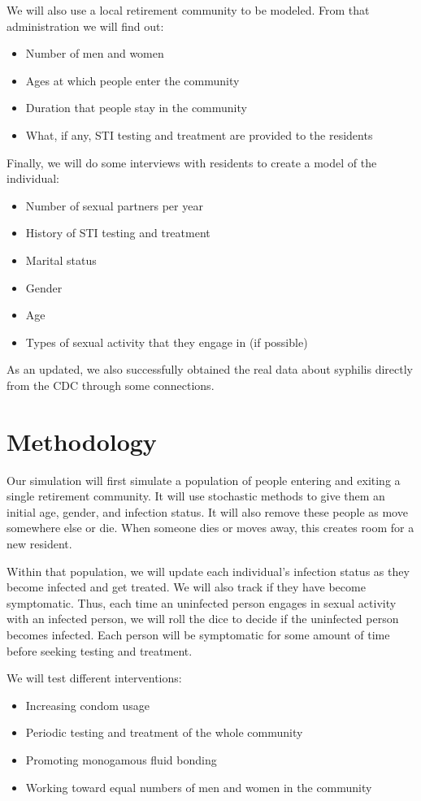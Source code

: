 \documentclass{article}
\begin{document}
\begin{normalsize}
   	We will also use a local retirement community to be modeled. From that administration we will find out:
   	\begin{itemize}
    \item Number of men and women 
    \item Ages at which people enter the community
    \item Duration that people stay in the community
    \item What, if any, STI testing and treatment are provided to the residents
   	\end{itemize}     
   	
   	Finally, we will do some interviews with residents to create a model of the individual:
   	\begin{itemize}
    \item Number of sexual partners per year
    \item History of STI testing and treatment 
    \item Marital status
    \item Gender
    \item Age
    \item Types of sexual activity that they engage in (if possible)
   	\end{itemize}     
   	
   	As an updated, we also successfully obtained the real data about syphilis directly from the CDC through some connections.
   	
   	\section{Methodology}
   	Our simulation will first simulate a population of people entering and exiting a single retirement community. It will use stochastic methods to give them an initial age, gender, and infection status.  It will also remove these people as move somewhere else or die. When someone dies or moves away, this creates room for a new resident.
   	
   	Within that population, we will update each individual's infection status as they become infected and get treated. We will also track if they have become symptomatic. Thus, each time an uninfected person engages in sexual activity with an infected person, we will roll the dice to decide if the uninfected person becomes infected. Each person will be symptomatic for some amount of time before seeking testing and treatment.
   	
   	We will test different interventions:
   	\begin{itemize}
    \item Increasing condom usage
    \item Periodic testing and treatment of the whole community 
    \item Promoting monogamous fluid bonding
	\item Working toward equal numbers of men and women in the community
   	\end{itemize}     
    

\end{normalsize}
\end{document}
